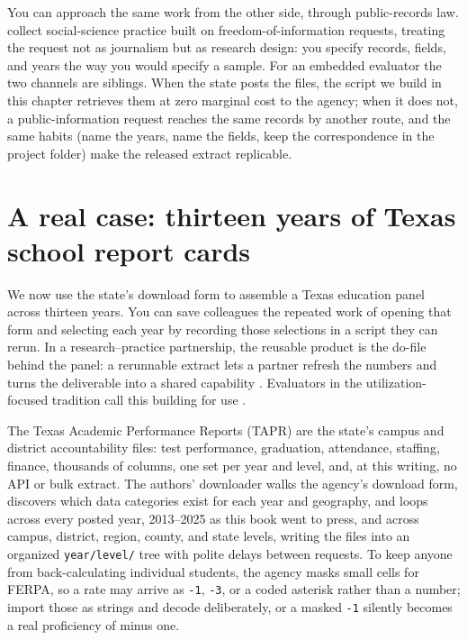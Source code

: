 You can approach the same work from the other side, through public-records law. \textcite{walby2019foi} collect social-science practice built on freedom-of-information requests, treating the request not as journalism but as research design: you specify records, fields, and years the way you would specify a sample. For an embedded evaluator the two channels are siblings. When the state posts the files, the script we build in this chapter retrieves them at zero marginal cost to the agency; when it does not, a public-information request reaches the same records by another route, and the same habits (name the years, name the fields, keep the correspondence in the project folder) make the released extract replicable.

\section{A real case: thirteen years of Texas school report cards}
We now use the state's download form to assemble a Texas education panel across thirteen years. You can save colleagues the repeated work of opening that form and selecting each year by recording those selections in a script they can rerun. In a research--practice partnership, the reusable product is the do-file behind the panel: a rerunnable extract lets a partner refresh the numbers and turns the deliverable into a shared capability \parencite{coburn2016partnerships}. Evaluators in the utilization-focused tradition call this building for use \parencite{patton2008utilization}.

The Texas Academic Performance Reports (TAPR) are the state's campus and district accountability files: test performance, graduation, attendance, staffing, finance, thousands of columns, one set per year and level, and, at this writing, no API or bulk extract. The authors' downloader walks the agency's download form, discovers which data categories exist for each year and geography, and loops across every posted year, 2013--2025 as this book went to press, and across campus, district, region, county, and state levels, writing the files into an organized \texttt{year/level/} tree with polite delays between requests. To keep anyone from back-calculating individual students, the agency masks small cells for FERPA, so a rate may arrive as \texttt{-1}, \texttt{-3}, or a coded asterisk rather than a number; import those as strings and decode deliberately, or a masked \texttt{-1} silently becomes a real proficiency of minus one.

